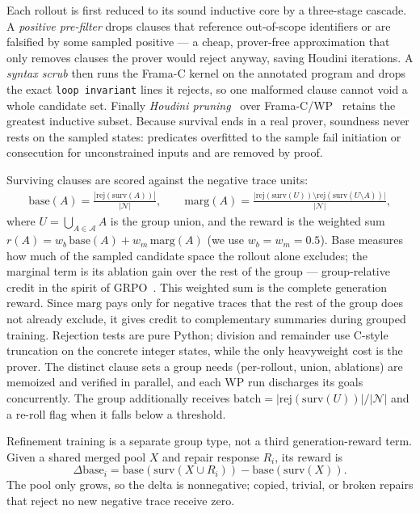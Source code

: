 Each rollout is first reduced to its sound inductive core by a three-stage cascade.
A \emph{positive pre-filter} drops clauses that reference out-of-scope identifiers or are falsified by some sampled positive --- a cheap, prover-free approximation that only removes clauses the prover would reject anyway, saving Houdini iterations.
A \emph{syntax scrub} then runs the Frama-C kernel on the annotated program and drops the exact \texttt{loop invariant} lines it rejects, so one malformed clause cannot void a whole candidate set.
Finally \emph{Houdini pruning}~\citep{flanagan2001houdini} over Frama-C/WP~\citep{framac} retains the greatest inductive subset.
Because survival ends in a real prover, soundness never rests on the sampled states: predicates overfitted to the sample fail initiation or consecution for unconstrained inputs and are removed by proof.

Surviving clauses are scored against the negative trace units:
\begin{align}
\mathrm{base}(A) = \frac{|\mathrm{rej}(\mathrm{surv}(A))|}{|\mathcal{N}|},
\qquad
\mathrm{marg}(A) = \frac{\bigl|\mathrm{rej}(\mathrm{surv}(U)) \setminus \mathrm{rej}(\mathrm{surv}(U \setminus A))\bigr|}{|\mathcal{N}|},
\end{align}
where $U = \bigcup_{A \in \mathcal{A}} A$ is the group union, and the reward is the weighted sum $r(A) = w_b\,\mathrm{base}(A) + w_m\,\mathrm{marg}(A)$ (we use $w_b = w_m = 0.5$).
Base measures how much of the sampled candidate space the rollout alone excludes; the marginal term is its ablation gain over the rest of the group --- group-relative credit in the spirit of GRPO~\citep{shao2024deepseekmath}.
This weighted sum is the complete generation reward.  Since $\mathrm{marg}$ pays only for negative traces that the rest of the group does not already exclude, it gives credit to complementary summaries during grouped training.
Rejection tests are pure Python; division and remainder use C-style truncation on the concrete integer states, while the only heavyweight cost is the prover.  The distinct clause sets a group needs (per-rollout, union, ablations) are memoized and verified in parallel, and each WP run discharges its goals concurrently.
The group additionally receives $\mathrm{batch} = |\mathrm{rej}(\mathrm{surv}(U))| / |\mathcal{N}|$ and a re-roll flag when it falls below a threshold.

Refinement training is a separate group type, not a third generation-reward term.  Given a shared merged pool $X$ and repair response $R_i$, its reward is
\begin{equation}
\Delta\mathrm{base}_i = \mathrm{base}(\mathrm{surv}(X \cup R_i)) - \mathrm{base}(\mathrm{surv}(X)).
\end{equation}
The pool only grows, so the delta is nonnegative; copied, trivial, or broken repairs that reject no new negative trace receive zero.

